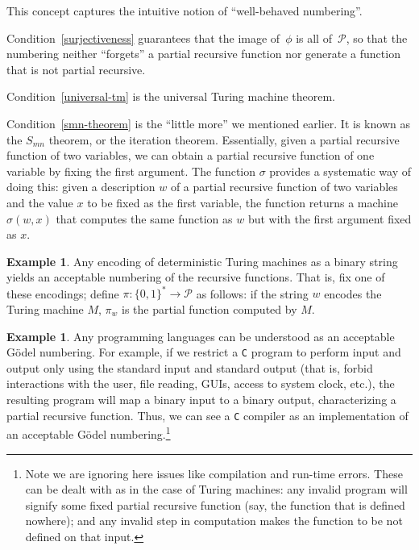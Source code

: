 \documentclass[12pt]{article}
\theoremstyle{definition}
\newtheorem{example}[definition]{Example}
\begin{document}
This concept captures the intuitive notion of
``well-behaved numbering''.

Condition~\ref{surjectiveness}
guarantees that the image of~$\phi$ is all of~$\mathcal P$,
so that the numbering neither ``forgets'' a partial recursive function
nor generate a function that is not partial recursive.

Condition~\ref{universal-tm} is the universal Turing machine theorem.

Condition~\ref{smn-theorem} is the ``little more'' we mentioned earlier.
It is known as the $S_{mn}$ theorem, or the iteration theorem.
Essentially,
given a partial recursive function of two variables,
we can obtain a partial recursive function of one variable
by fixing the first argument.
The function $\sigma$ provides a systematic way of doing this:
given a description $w$ of a partial recursive function of two variables
and the value $x$ to be fixed as the first variable,
the function returns a machine $\sigma(w, x)$
that computes the same function as $w$ but with the first argument fixed as $x$.

\begin{example}
    Any encoding of deterministic Turing machines as a binary string
    yields an acceptable numbering of the recursive functions.
    That is, fix one of these encodings;
    define $\pi: \{0, 1\}^* \to \mathcal P$ as follows:
    if the string $w$ encodes the Turing machine $M$,
    $\pi_w$ is the partial function computed by $M$.
\end{example}

\begin{example}\label{c}
    Any programming languages can be understood as an acceptable Gödel numbering.
    For example,
    if we restrict a \texttt C program
    to perform input and output only using the standard input and standard output
    (that is, forbid interactions with the user, file reading, GUIs,
    access to system clock, etc.),
    the resulting program will map a binary input to a binary output,
    characterizing a partial recursive function.
    Thus, we can see a \texttt C compiler
    as an implementation of an acceptable Gödel numbering.\footnote{
        Note we are ignoring here issues like compilation and run-time errors.
        These can be dealt with as in the case of Turing machines:
        any invalid program will signify some fixed partial recursive function
        (say, the function that is defined nowhere);
        and any invalid step in computation
        makes the function to be not defined on that input.
    }
\end{example}
\end{document}

